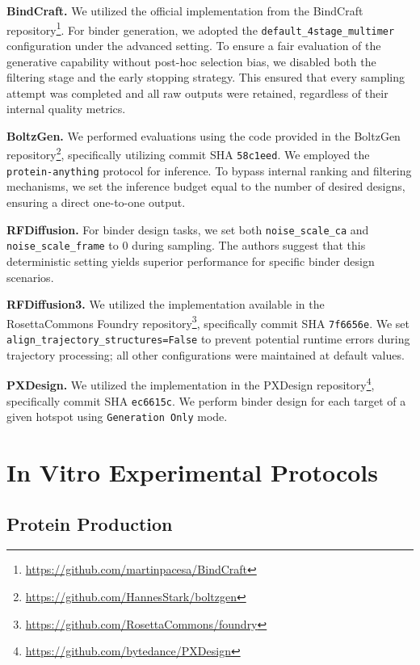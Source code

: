 \documentclass[]{bytedance_seed}
\begin{document}
\textbf{BindCraft.} We utilized the official implementation from the BindCraft repository\footnote{\url{https://github.com/martinpacesa/BindCraft}}. For binder generation, we adopted the \texttt{default\_4stage\_multimer} configuration under the advanced setting. To ensure a fair evaluation of the generative capability without post-hoc selection bias, we disabled both the filtering stage and the early stopping strategy. This ensured that every sampling attempt was completed and all raw outputs were retained, regardless of their internal quality metrics.

\textbf{BoltzGen.} We performed evaluations using the code provided in the BoltzGen repository\footnote{\url{https://github.com/HannesStark/boltzgen}}, specifically utilizing commit SHA \texttt{58c1eed}. We employed the \texttt{protein-anything} protocol for inference. To bypass internal ranking and filtering mechanisms, we set the inference budget equal to the number of desired designs, ensuring a direct one-to-one output.

\textbf{RFDiffusion.} For binder design tasks, we set both \texttt{noise\_scale\_ca} and \texttt{noise\_scale\_frame} to 0 during sampling. The authors suggest that this deterministic setting yields superior performance for specific binder design scenarios.

\textbf{RFDiffusion3.} We utilized the implementation available in the RosettaCommons Foundry repository\footnote{\url{https://github.com/RosettaCommons/foundry}}, specifically commit SHA \texttt{7f6656e}. We set \texttt{align\_trajectory\_structures=False} to prevent potential runtime errors during trajectory processing; all other configurations were maintained at default values.

\textbf{PXDesign.} We utilized the implementation in the PXDesign repository\footnote{\url{https://github.com/bytedance/PXDesign}}, specifically commit SHA \texttt{ec6615c}. We perform binder design for each target of a given hotspot using \texttt{Generation Only} mode.

\section{In Vitro Experimental Protocols}
\label{app:invitro_protocols}

\subsection{Protein Production}
\label{app:protein_production}
\end{document}
